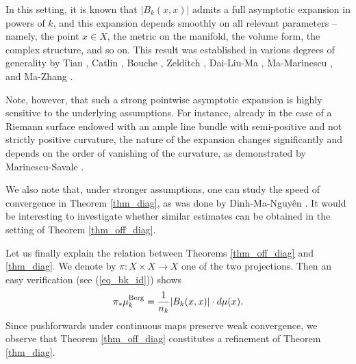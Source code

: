 \documentclass[12pt]{article}
\numberwithin{equation}{section}
\theoremstyle{theorem}
\theoremstyle{definition}
\theoremstyle{remark}
\begin{document}
	In this setting, it is known that $|B_k(x, x)|$ admits a full asymptotic expansion in powers of $k$, and this expansion depends smoothly on all relevant parameters -- namely, the point $x \in X$, the metric on the manifold, the volume form, the complex structure, and so on.  
	This result was established in various degrees of generality by Tian \cite{TianBerg}, Catlin \cite{Caltin}, Bouche \cite{Bouche}, Zelditch \cite{ZeldBerg}, Dai-Liu-Ma \cite{DaiLiuMa}, Ma-Marinescu \cite{MaHol}, and Ma-Zhang \cite{MaZhangSuperconn}.
	\par 
	Note, however, that such a strong pointwise asymptotic expansion is highly sensitive to the underlying assumptions.  
	For instance, already in the case of a Riemann surface endowed with an ample line bundle with semi-positive and not strictly positive curvature, the nature of the expansion changes significantly and depends on the order of vanishing of the curvature, as demonstrated by Marinescu-Savale \cite{MarinSaval}.
	\par 
	We also note that, under stronger assumptions, one can study the speed of convergence in Theorem \ref{thm_diag}, as was done by Dinh-Ma-Nguyên \cite[Theorem 2.11]{DinhMaNgu}. 
	It would be interesting to investigate whether similar estimates can be obtained in the setting of Theorem \ref{thm_off_diag}.
	\par 
	Let us finally explain the relation between Theorems \ref{thm_off_diag} and \ref{thm_diag}.
	We denote by $\pi: X \times X \to X$ one of the two projections. 
	Then an easy verification (see (\ref{eq_bk_id})) shows
	\begin{equation}\label{eq_push_forw}
		\pi_* \mu_k^{\rm{Berg}}
		=
		\frac{1}{n_k} |B_k(x, x)| \cdot d \mu(x).
	\end{equation}
	Since pushforwards under continuous maps preserve weak convergence, we observe that Theorem \ref{thm_off_diag} constitutes a refinement of Theorem \ref{thm_diag}.
	\par 
\end{document}

